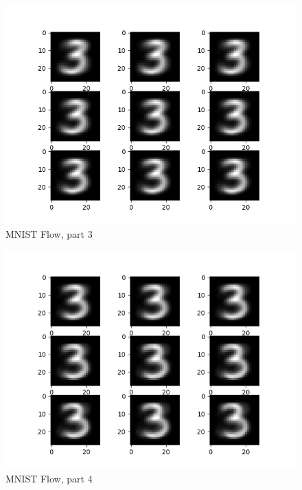 \documentclass[12pt]{report}
\begin{document}
\begin{figure}[h]
    \begin{center}
        \includegraphics[]{mnist3.png}
        \caption{MNIST Flow, part 3}
        \label{fig:pflowtoy}
    \end{center}
\end{figure}


\begin{figure}[h]
    \begin{center}
        \includegraphics[]{mnist4.png}
        \caption{MNIST Flow, part 4}       
        \label{fig:pflowtoy}
    \end{center}
\end{figure}
\end{document}
